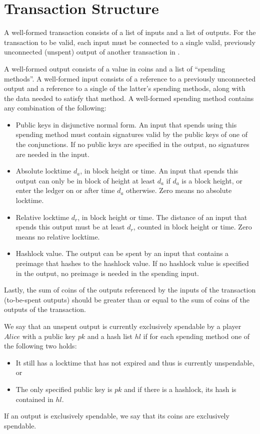 \section{Transaction Structure}
  \label{appendix:txstructure}
  A well-formed transaction consists of a list of inputs and a list of outputs.
  For the transaction to be valid, each input must be connected to a single
  valid, previously unconnected (unspent) output of another transaction in
  \ledger.

  A well-formed output consists of a value in coins and a list of ``spending
  methods''. A well-formed input consists of a reference to a previously
  unconnected output and a reference to a single of the latter's spending
  methods, along with the data needed to satisfy that method. A well-formed
  spending method contains any combination of the following:
  \begin{itemize}
    \item Public keys in disjunctive normal form. An input that spends using
    this spending method must contain signatures valid by the public keys of one
    of the conjunctions. If no public keys are specified in the output, no
    signatures are needed in the input.
    \item Absolute locktime $d_a$, in block height or time. An input that spends
    this output can only be in block of height at least $d_a$ if $d_a$ is a
    block height, or enter the ledger on or after time $d_a$ otherwise. Zero
    means no absolute locktime.
    \item Relative locktime $d_r$, in block height or time. The distance of an
    input that spends this output must be at least $d_r$, counted in block
    height or time. Zero means no relative locktime.
    \item Hashlock value. The output can be spent by an input that contains a
    preimage that hashes to the hashlock value. If no hashlock value is
    specified in the output, no preimage is needed in the spending input.
  \end{itemize}

  Lastly, the sum of coins of the outputs referenced by the inputs of the
  transaction (to-be-spent outputs) should be greater than or equal to the sum
  of coins of the outputs of the transaction.

  We say that an unspent output is currently exclusively spendable by a player
  $Alice$ with a public key $pk$ and a hash list $hl$ if for each spending
  method one of the following two holds:
  \begin{itemize}
    \item It still has a locktime that has not expired and thus is currently
    unspendable, or
    \item The only specified public key is $pk$ and if there is a hashlock, its
    hash is contained in $hl$.
  \end{itemize}
  If an output is exclusively spendable, we say that its coins are exclusively
  spendable.
